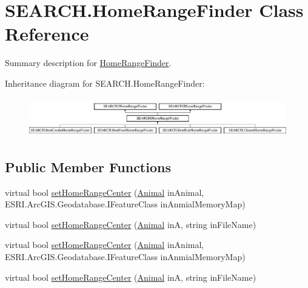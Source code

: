 \hypertarget{class_s_e_a_r_c_h_1_1_home_range_finder}{\section{S\-E\-A\-R\-C\-H.\-Home\-Range\-Finder Class Reference}
\label{class_s_e_a_r_c_h_1_1_home_range_finder}
}


Summary description for \hyperlink{class_s_e_a_r_c_h_1_1_home_range_finder}{Home\-Range\-Finder}.  


Inheritance diagram for S\-E\-A\-R\-C\-H.\-Home\-Range\-Finder\-:\begin{figure}[H]
\begin{center}
\leavevmode
\includegraphics[height=1.728395cm]{class_s_e_a_r_c_h_1_1_home_range_finder}
\end{center}
\end{figure}
\subsection*{Public Member Functions}
\begin{DoxyCompactItemize}
\item 
virtual bool \hyperlink{class_s_e_a_r_c_h_1_1_home_range_finder_a1215e70b082e787d5dd87180641339a6}{set\-Home\-Range\-Center} (\hyperlink{class_s_e_a_r_c_h_1_1_animal}{Animal} in\-Animal, E\-S\-R\-I.\-Arc\-G\-I\-S.\-Geodatabase.\-I\-Feature\-Class in\-Anmial\-Memory\-Map)
\item 
virtual bool \hyperlink{class_s_e_a_r_c_h_1_1_home_range_finder_a41b187329b1cd89b91c9c2f4a145ec7b}{set\-Home\-Range\-Center} (\hyperlink{class_s_e_a_r_c_h_1_1_animal}{Animal} in\-A, string in\-File\-Name)
\item 
virtual bool \hyperlink{class_s_e_a_r_c_h_1_1_home_range_finder_a1215e70b082e787d5dd87180641339a6}{set\-Home\-Range\-Center} (\hyperlink{class_s_e_a_r_c_h_1_1_animal}{Animal} in\-Animal, E\-S\-R\-I.\-Arc\-G\-I\-S.\-Geodatabase.\-I\-Feature\-Class in\-Anmial\-Memory\-Map)
\item 
virtual bool \hyperlink{class_s_e_a_r_c_h_1_1_home_range_finder_a41b187329b1cd89b91c9c2f4a145ec7b}{set\-Home\-Range\-Center} (\hyperlink{class_s_e_a_r_c_h_1_1_animal}{Animal} in\-A, string in\-File\-Name)
\end{DoxyCompactItemize}
